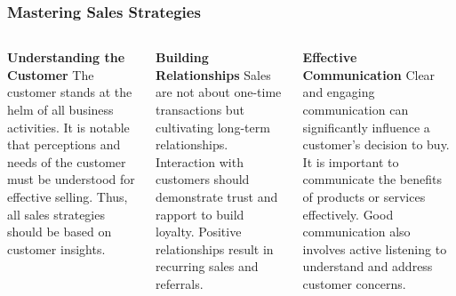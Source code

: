 \documentclass[5pt]{beamer}
\begin{document}
\begin{frame}
\frametitle{Mastering Sales Strategies}
\begin{columns}
\begin{column}{0.3\textwidth}
\begin{block}{\textbf{Understanding the Customer}}
The customer stands at the helm of all business activities. It is notable that perceptions and needs of the customer must be understood for effective selling. Thus, all sales strategies should be based on customer insights.
\end{block}
\end{column}
\begin{column}{0.3\textwidth}
\begin{block}{\textbf{Building Relationships}}
Sales are not about one-time transactions but cultivating long-term relationships. Interaction with customers should demonstrate trust and rapport to build loyalty. Positive relationships result in recurring sales and referrals.
\end{block}
\end{column}
\begin{column}{0.3\textwidth}
\begin{block}{\textbf{Effective Communication}}
Clear and engaging communication can significantly influence a customer's decision to buy. It is important to communicate the benefits of products or services effectively. Good communication also involves active listening to understand and address customer concerns.
\end{block}
\end{column}
\end{columns}
\end{frame}
\end{document}
